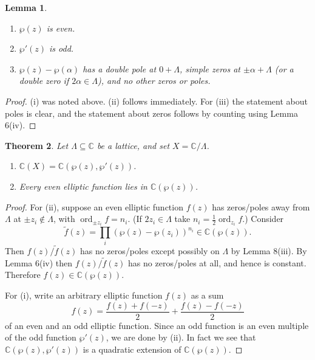 \documentclass[a4paper]{article}
\theoremstyle{plain}
\newtheorem{theorem}{Theorem}
\newtheorem{lemma}[theorem]{Lemma}
\theoremstyle{remark}
\theoremstyle{definition}
\DeclareMathOperator{\ord}{ord}
\newcommand{\C}{\mathbb{C}}
\begin{document}
\begin{lemma}
    ~
    \begin{enumerate}[label=(\roman*)]
        \item $\wp(z)$ is even.
        \item $\wp'(z)$ is odd.
        \item $\wp(z)-\wp(\alpha)$ has a double pole at $0+\Lambda$, simple
            zeros at $\pm\alpha+\Lambda$ (or a double zero if
            $2\alpha\in\Lambda$), and no other zeros or poles.
    \end{enumerate}
\end{lemma}

\begin{proof}
    (i) was noted above. (ii) follows immediately. For (iii) the statement about
    poles is clear, and the statement about zeros follows by counting using
    Lemma 6(iv).
\end{proof}

\begin{theorem}
    Let $\Lambda\subseteq\C$ be a lattice, and set $X=\C/\Lambda$.
    \begin{enumerate}[label=(\roman*)]
        \item $\C(X)=\C(\wp(z),\wp'(z))$.
        \item Every even elliptic function lies in $\C(\wp(z))$.
    \end{enumerate}
\end{theorem}

\begin{proof}
    For (ii), suppose an even elliptic function $f(z)$ has zeros/poles away from
    $\Lambda$ at $\pm z_i\notin\Lambda$, with $\ord_{\pm z_i}f=n_i$. (If
    $2z_i\in\Lambda$ take $n_i=\frac{1}{2}\ord_{z_i}f$.) Consider
    \begin{equation*}
        \tilde f(z)=\prod_i(\wp(z)-\wp(z_i))^{n_i} \in \C(\wp(z)).
    \end{equation*}
    Then $f(z)/\tilde f(z)$ has no zeros/poles except possibly on $\Lambda$ by
    Lemma 8(iii). By Lemma 6(iv) then $f(z)/\tilde f(z)$ has no zeros/poles at
    all, and hence is constant. Therefore $f(z)\in\C(\wp(z))$.

    For (i), write an arbitrary elliptic function $f(z)$ as a sum
    \begin{equation*}
        f(z) = \frac{f(z)+f(-z)}{2} + \frac{f(z)-f(-z)}{2}
    \end{equation*}
    of an even and an odd elliptic function. Since an odd function is an even
    multiple of the odd function $\wp'(z)$, we are done by (ii). In fact we see
    that $\C(\wp(z),\wp'(z))$ is a quadratic extension of $\C(\wp(z))$.
\end{proof}
\end{document}

